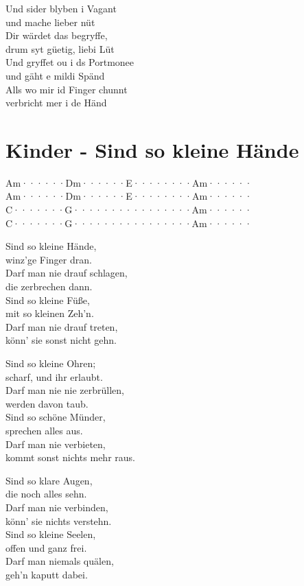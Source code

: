 \documentclass[
  letterpaper,
]{scrbook}
\begin{document}
Und sider blyben i Vagant\\
und mache lieber nüt\\
Dir wärdet das begryffe,\\
drum syt güetig, liebi Lüt\\
Und gryffet ou i ds Portmonee\\
und gäht e mildi Spänd\\
Alls wo mir id Finger chunnt\\
verbricht mer i de Händ

\hypertarget{kinder---sind-so-kleine-huxe4nde}{%
\chapter{Kinder - Sind so kleine
Hände}\label{kinder---sind-so-kleine-huxe4nde}}

Am······\textbar Dm······\textbar E········\textbar Am······\textbar{}\\
Am······\textbar Dm······\textbar E········\textbar Am······\textbar{}\\
C·······\textbar G·······\textbar·········\textbar Am······\textbar{}\\
C·······\textbar G·······\textbar·········\textbar Am······\textbar{}

Sind so kleine Hände,\\
winz'ge Finger dran.\\
Darf man nie drauf schlagen,\\
die zerbrechen dann.\\
Sind so kleine Füße,\\
mit so kleinen Zeh'n.\\
Darf man nie drauf treten,\\
könn' sie sonst nicht gehn.

Sind so kleine Ohren;\\
scharf, und ihr erlaubt.\\
Darf man nie nie zerbrüllen,\\
werden davon taub.\\
Sind so schöne Münder,\\
sprechen alles aus.\\
Darf man nie verbieten,\\
kommt sonst nichts mehr raus.

Sind so klare Augen,\\
die noch alles sehn.\\
Darf man nie verbinden,\\
könn' sie nichts verstehn.\\
Sind so kleine Seelen,\\
offen und ganz frei.\\
Darf man niemals quälen,\\
geh'n kaputt dabei.
\end{document}
